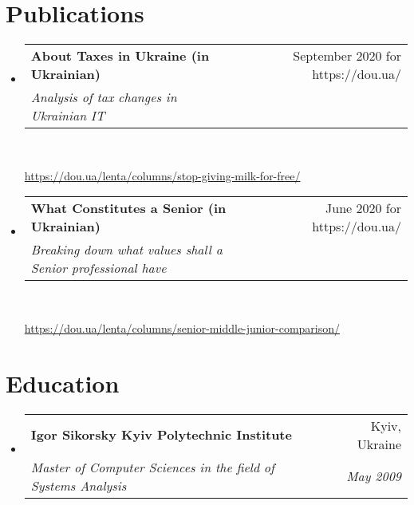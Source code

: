 \documentclass[letterpaper,11pt]{article}
\makeatletter
\newcommand{\resumeSubheading}[4]{
  \vspace{-1pt}\item
    \begin{tabular*}{0.97\textwidth}[t]{l@{\extracolsep{\fill}}r}
      \textbf{#1} & #2 \\
      \textit{\small#3} & \textit{\small #4} \\
    \end{tabular*}\vspace{-5pt}
}
\newcommand{\resumeSubHeadingListStart}{\begin{itemize}[leftmargin=*]}
\newcommand{\resumeSubHeadingListEnd}{\end{itemize}}
\makeatother
\begin{document}
\section{Publications}
  \resumeSubHeadingListStart
    \resumeSubheading
      {About Taxes in Ukraine (in Ukrainian)}{September 2020 for https://dou.ua/}
      {Analysis of tax changes in Ukrainian IT}{}
      \
      
      \href{https://dou.ua/lenta/columns/stop-giving-milk-for-free/}{https://dou.ua/lenta/columns/stop-giving-milk-for-free/}

    \resumeSubheading
      {What Constitutes a Senior (in Ukrainian)}{June 2020 for https://dou.ua/}
      {Breaking down what values shall a Senior professional have}{}
      \
      
      \href{https://dou.ua/lenta/columns/senior-middle-junior-comparison/}{https://dou.ua/lenta/columns/senior-middle-junior-comparison/}

  \resumeSubHeadingListEnd

\section{Education}
  \resumeSubHeadingListStart
    \resumeSubheading
      {Igor Sikorsky Kyiv Polytechnic Institute}{Kyiv, Ukraine}
      {Master of Computer Sciences in the field of Systems Analysis}{May 2009}

  \resumeSubHeadingListEnd



\end{document}
